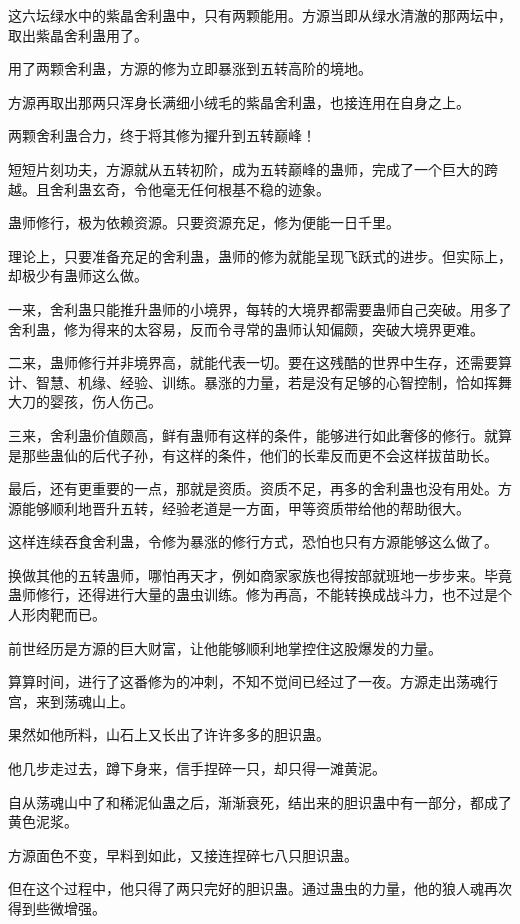 \begin{this_body}
这六坛绿水中的紫晶舍利蛊中，只有两颗能用。方源当即从绿水清澈的那两坛中，取出紫晶舍利蛊用了。

用了两颗舍利蛊，方源的修为立即暴涨到五转高阶的境地。

方源再取出那两只浑身长满细小绒毛的紫晶舍利蛊，也接连用在自身之上。

两颗舍利蛊合力，终于将其修为擢升到五转巅峰！

短短片刻功夫，方源就从五转初阶，成为五转巅峰的蛊师，完成了一个巨大的跨越。且舍利蛊玄奇，令他毫无任何根基不稳的迹象。

蛊师修行，极为依赖资源。只要资源充足，修为便能一日千里。

理论上，只要准备充足的舍利蛊，蛊师的修为就能呈现飞跃式的进步。但实际上，却极少有蛊师这么做。

一来，舍利蛊只能推升蛊师的小境界，每转的大境界都需要蛊师自己突破。用多了舍利蛊，修为得来的太容易，反而令寻常的蛊师认知偏颇，突破大境界更难。

二来，蛊师修行并非境界高，就能代表一切。要在这残酷的世界中生存，还需要算计、智慧、机缘、经验、训练。暴涨的力量，若是没有足够的心智控制，恰如挥舞大刀的婴孩，伤人伤己。

三来，舍利蛊价值颇高，鲜有蛊师有这样的条件，能够进行如此奢侈的修行。就算是那些蛊仙的后代子孙，有这样的条件，他们的长辈反而更不会这样拔苗助长。

最后，还有更重要的一点，那就是资质。资质不足，再多的舍利蛊也没有用处。方源能够顺利地晋升五转，经验老道是一方面，甲等资质带给他的帮助很大。

这样连续吞食舍利蛊，令修为暴涨的修行方式，恐怕也只有方源能够这么做了。

换做其他的五转蛊师，哪怕再天才，例如商家家族也得按部就班地一步步来。毕竟蛊师修行，还得进行大量的蛊虫训练。修为再高，不能转换成战斗力，也不过是个人形肉靶而已。

前世经历是方源的巨大财富，让他能够顺利地掌控住这股爆发的力量。

算算时间，进行了这番修为的冲刺，不知不觉间已经过了一夜。方源走出荡魂行宫，来到荡魂山上。

果然如他所料，山石上又长出了许许多多的胆识蛊。

他几步走过去，蹲下身来，信手捏碎一只，却只得一滩黄泥。

自从荡魂山中了和稀泥仙蛊之后，渐渐衰死，结出来的胆识蛊中有一部分，都成了黄色泥浆。

方源面色不变，早料到如此，又接连捏碎七八只胆识蛊。

但在这个过程中，他只得了两只完好的胆识蛊。通过蛊虫的力量，他的狼人魂再次得到些微增强。


\end{this_body}
